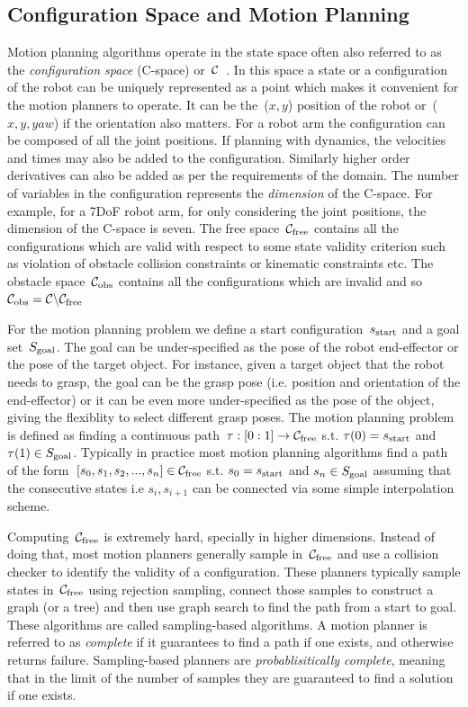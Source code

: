 \documentclass[a4paper,10pt]{article}
\begin{document}
\subsection{Configuration Space and Motion Planning}
Motion planning algorithms operate in the state space often also referred to as the \emph{configuration space} (C-space) or~$\mathcal{C}$~\cite{lozano1990spatial}. In this space a state or a configuration of the robot can be uniquely represented as a point which makes it convenient for the motion planners to operate. It can be the~($x,y$) position of the robot or~($x,y,yaw$) if the orientation also matters. For a robot arm the configuration can be composed of all the joint positions. If planning with dynamics, the velocities and times may also be added to the configuration. Similarly higher order derivatives can also be added as per the requirements of the domain. The number of variables in the configuration represents the \emph{dimension} of the C-space. For example, for a 7DoF robot arm, for only considering the joint positions, the dimension of the C-space is seven. The free space~$\mathcal{C}_{\rm free}$ contains all the configurations which are valid with respect to some state validity criterion such as violation of obstacle collision constraints or kinematic constraints etc. The obstacle space~$\mathcal{C}_{\rm obs}$ contains all the configurations which are invalid and so~$\mathcal{C}_{\rm obs} = \mathcal{C} \backslash \mathcal{C}_{\rm free}$

For the motion planning problem we define a start configuration~$s_{\textrm{start}}$ and a goal set~$S_{\rm goal}$. The goal can be under-specified as the pose of the robot end-effector or the pose of the target object. For instance, given a target object that the robot needs to grasp, the goal can be the grasp pose (i.e. position and orientation of the end-effector) or it can be even more under-specified as the pose of the object, giving the flexiblity to select different grasp poses. The motion planning problem is defined as finding a continuous path~$\tau : [0:1] \rightarrow \mathcal{C}_{\rm free}$ s.t. $\tau(0) = s_{\textrm{start}}$ and $\tau(1) \in S_{\rm goal} $. Typically in practice most motion planning algorithms find a path of the form~$[s_0, s_1, s_2,...,s_n] \in \mathcal{C}_{\rm free}$ s.t. $s_0 = s_{\textrm{start}}$ and $s_n \in S_{\rm goal}$ assuming that the consecutive states i.e $s_i, s_{i+1}$ can be connected via some simple interpolation scheme.

Computing~$\mathcal{C}_{\rm free}$ is extremely hard, specially in higher dimensions. Instead of doing that, most motion planners generally sample in~$\mathcal{C}_{\rm free}$ and use a collision checker to identify the validity of a configuration. These planners typically sample states in~$\mathcal{C}_{\rm free}$ using rejection sampling, connect those samples to construct a graph (or a tree) and then use graph search to find the path from a start to goal. These algorithms are called sampling-based algorithms. A motion planner is referred to as \emph{complete} if it guarantees to find a path if one exists, and otherwise returns failure. Sampling-based planners are \emph{probablisitically complete}, meaning that in the limit of the number of samples they are guaranteed to find a solution if one exists.
\end{document}
